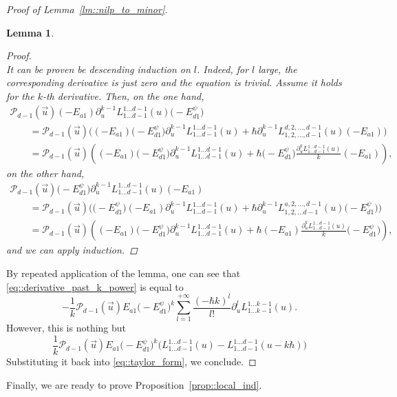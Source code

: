 \documentclass[10pt,a4paper]{article}
\numberwithin{equation}{section}
\newtheorem{Lemma}[Theorem]{Lemma}
\newcommand{\calP}{\mathcal{P}}
\begin{document}
\begin{proof}[Proof of Lemma~\ref{lm::nilp_to_minor}]
\begin{Lemma}
\begin{proof}
\[				\]
				It can be proven be descending induction on $l$. Indeed, for $l$ large, the corresponding derivative is just zero and the equation is trivial. Assume it holds for the $k$-th derivative. Then, on the one hand,
				\begin{gather*}
					\calP_{d-1}(\vec{u})(-E_{a1}) \partial_u^{k-1} L_{1\dots d-1}^{1\dots d-1}(u) \bigl(-E_{d1}^{\psi}\bigr) \\
				\qquad	= \calP_{d-1}(\vec{u})\bigl( (-E_{a1}) \bigl(-E_{d1}^{\psi}\bigr) \partial_u^{k-1} L_{1\dots d-1}^{1\dots d-1}(u) + \hbar \partial_u^{k-1} L_{1,2,\dots, d-1}^{d,2,\dots,d-1}(u) (-E_{a1}) \bigr) \\
					\qquad=\calP_{d-1}(\vec{u}) \left((-E_{a1}) \bigl(-E_{d1}^{\psi}\bigr) \partial_u^{k-1} L_{1\dots d-1}^{1\dots d-1}(u) + \hbar \bigl(-E_{d1}^{\psi}\bigr) \frac{\partial_u^k L_{1\dots d-1}^{1\dots d-1}(u)}{k} (-E_{a1}) \right),
				\end{gather*}
				on the other hand,
				\begin{gather*}
					\calP_{d-1}(\vec{u})\bigl(-E_{d1}^{\psi}\bigr) \partial_u^{k-1} L_{1\dots d-1}^{1\dots d-1}(u) (-E_{a1}) \\
					\qquad= \calP_{d-1}(\vec{u}) \bigl( \bigl(-E_{d1}^{\psi}\bigr) (-E_{a1}) \partial_u^{k-1} L_{1\dots d-1}^{1\dots d-1}(u) + \hbar \partial_u^{k-1} L_{1,2,\dots d-1}^{a,2,\dots,d-1}(u) \bigl(-E_{d1}^{\psi}\bigr) \bigr) \\
					\qquad=\calP_{d-1}(\vec{u}) \left((-E_{a1}) \bigl(-E_{d1}^{\psi}\bigr) \partial_u^{k-1} L_{1\dots d-1}^{1\dots d-1}(u) + \hbar (-E_{a1}) \frac{\partial_u^k L_{1\dots d-1}^{1\dots d-1}(u)}{k} \bigl(-E_{d1}^{\psi}\bigr) \right),
				\end{gather*}
				and we can apply induction.
			\end{proof}
		\end{Lemma}
		By repeated application of the lemma, one can see that \eqref{eq::derivative_past_k_power} is equal to
		\[
		-\frac{1}{k} \calP_{d-1}(\vec{u}) E_{a1} \bigl(-E_{d1}^{\psi}\bigr)^k \sum\limits_{l=1}^{+\infty} \frac{(-\hbar k)^l}{l!} \partial_u^l L_{1\dots k-1}^{1\dots k-1}(u).
		\]
		However, this is nothing but
		\[
		\frac{1}{k} \calP_{d-1}(\vec{u})E_{a1} \bigl(-E_{d1}^{\psi}\bigr)^k \bigl(L_{1\dots d-1}^{1\dots d-1}(u) - L_{1\dots d-1}^{1\dots d-1}(u-k\hbar)\bigr)
		\]
		Substituting it back into \eqref{eq::taylor_form}, we conclude.
	\end{proof}
	
	Finally, we are ready to prove Proposition~\ref{prop::local_ind}.
	
\end{document}
